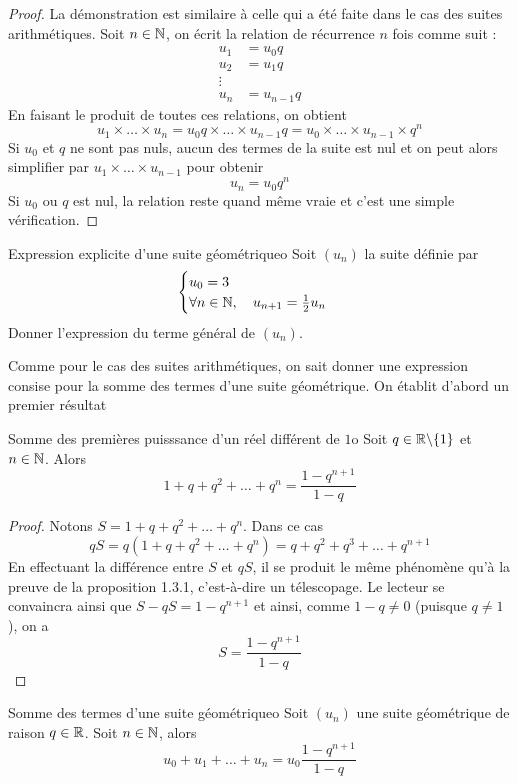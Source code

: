 \begin{proof}
	La démonstration est similaire à celle qui a été faite dans le cas des suites arithmétiques. Soit $n\in\mathbb{N}$, on écrit la relation de récurrence $n$ fois comme suit :
	\begin{align*}
		u_1 &= u_0q\\
		u_2 &= u_1q\\
		\vdots\\
		u_n &= u_{n-1}q
	\end{align*}
	En faisant le produit de toutes ces relations, on obtient \[u_1\times\dots\times u_n=u_0q\times\dots\times u_{n-1}q=u_0\times\dots\times u_{n-1}\times q^n\]
	Si $u_0$ et $q$ ne sont pas nuls, aucun des termes de la suite est nul et on peut alors simplifier par $u_1\times\dots\times u_{n-1}$ pour obtenir \[u_n=u_0q^n\]
	Si $u_0$ ou $q$ est nul, la relation reste quand même vraie et c'est une simple vérification.
\end{proof}

\begin{exemple}{Expression explicite d'une suite géométrique}{o}
	Soit $(u_n)$ la suite définie par \[\begin{cases}u_0=3\\\forall n\in\mathbb{N},\quad u_{n+1}=\frac12u_n\end{cases}\]
	Donner l'expression du terme général de $(u_n)$.
\end{exemple}
Comme pour le cas des suites arithmétiques, on sait donner une expression consise pour la somme des termes d'une suite géométrique. On établit d'abord un premier résultat

\begin{lemme}{Somme des premières puisssance d'un réel différent de $1$}{o}
Soit $q\in\mathbb{R}\backslash\lbrace 1\rbrace$ et $n\in\mathbb{N}$. Alors \[1+q+q^2+\dots+q^n=\frac{1-q^{n+1}}{1-q}\]
\end{lemme}

\begin{proof}
Notons $S=1+q+q^2+\dots+q^n$. Dans ce cas
\[qS=q(1+q+q^2+\dots+q^n)=q+q^2+q^3+\dots+q^{n+1}\]
En effectuant la différence entre $S$ et $qS$, il se produit le même phénomène qu'à la preuve de la proposition 1.3.1, c'est-à-dire un télescopage. Le lecteur se convaincra ainsi que $S-qS=1-q^{n+1}$ et ainsi, comme $1-q\neq 0$ (puisque $q\neq 1$), on a \[S=\frac{1-q^{n+1}}{1-q}\]
\end{proof}

\begin{proposition}{Somme des termes d'une suite géométrique}{o}
	Soit $(u_n)$ une suite géométrique de raison $q\in\mathbb{R}$. Soit $n\in\mathbb{N}$, alors \[u_0+u_1+\dots+u_n=u_0\frac{1-q^{n+1}}{1-q}\]
\end{proposition}

